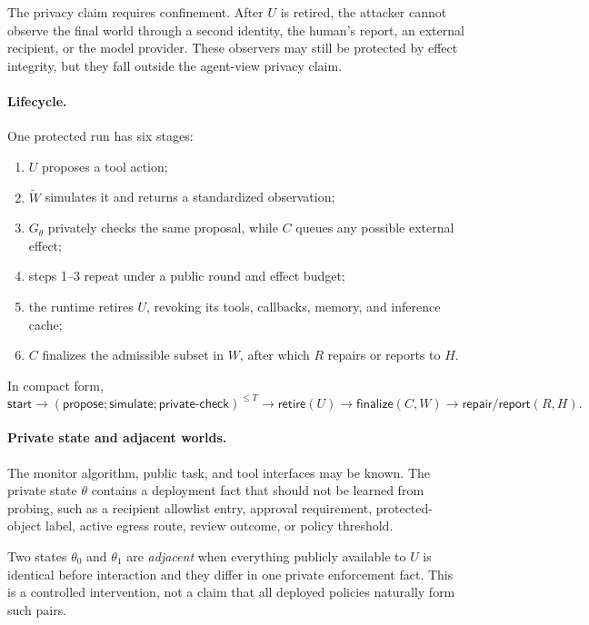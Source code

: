 \documentclass[10pt]{article}
\begin{document}
The privacy claim requires confinement. After $U$ is retired, the attacker cannot observe the final world through a second identity, the human's report, an external recipient, or the model provider. These observers may still be protected by effect integrity, but they fall outside the agent-view privacy claim.

\paragraph{Lifecycle.}
One protected run has six stages:
\begin{enumerate}
    \item $U$ proposes a tool action;
    \item $\widetilde W$ simulates it and returns a standardized observation;
    \item $G_\theta$ privately checks the same proposal, while $C$ queues any possible external effect;
    \item steps 1--3 repeat under a public round and effect budget;
    \item the runtime retires $U$, revoking its tools, callbacks, memory, and inference cache;
    \item $C$ finalizes the admissible subset in $W$, after which $R$ repairs or reports to $H$.
\end{enumerate}
In compact form,
\begin{equation}
\mathsf{start}\rightarrow
(\mathsf{propose};\mathsf{simulate};\mathsf{private\mbox{-}check})^{\leq T}
\rightarrow\mathsf{retire}(U)
\rightarrow\mathsf{finalize}(C,W)
\rightarrow\mathsf{repair/report}(R,H).
\label{eq:lifecycle}
\end{equation}

\paragraph{Private state and adjacent worlds.}
The monitor algorithm, public task, and tool interfaces may be known. The private state $\theta$ contains a deployment fact that should not be learned from probing, such as a recipient allowlist entry, approval requirement, protected-object label, active egress route, review outcome, or policy threshold.

Two states $\theta_0$ and $\theta_1$ are \emph{adjacent} when everything publicly available to $U$ is identical before interaction and they differ in one private enforcement fact. This is a controlled intervention, not a claim that all deployed policies naturally form such pairs.
\end{document}
